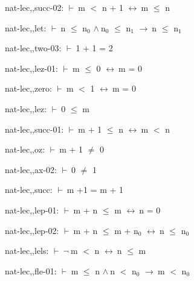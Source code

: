 \documentclass[a4paper]{article}
\newcommand{\Fol}{\mbox{$\vdash\ $}}
\newcommand{\Not}{\mbox{$\neg\ $}}
\newcommand{\And}{\mbox{$\wedge\ $}}
\newcommand{\Imp}{\mbox{$\rightarrow\ $}}
\newcommand{\Equiv}{\mbox{$\leftrightarrow\ $}}
\begin{document}
nat-lec,,succ-02: 
 \Fol m $<$ n + 1 \Equiv m $\le$ n



\bigskip

nat-lec,,let: 
 \Fol n $\le$ $\mbox{n}_{0}$ \And $\mbox{n}_{0}$ $\le$ $\mbox{n}_{1}$ \Imp n $\le$ $\mbox{n}_{1}$



\bigskip

nat-lec,,two-03: 
 \Fol 1 + 1 = 2



\bigskip

nat-lec,,lez-01: 
 \Fol m $\le$ 0 \Equiv m = 0



\bigskip

nat-lec,,zero: 
 \Fol m $<$ 1 \Equiv m = 0



\bigskip

nat-lec,,lez: 
 \Fol 0 $\le$ m



\bigskip

nat-lec,,succ-01: 
 \Fol m + 1 $\le$ n \Equiv m $<$ n



\bigskip

nat-lec,,oz: 
 \Fol m + 1 $\neq$ 0



\bigskip

nat-lec,,ax-02: 
 \Fol 0 $\neq$ 1



\bigskip

nat-lec,,succ: 
 \Fol m +1 = m + 1



\bigskip

nat-lec,,lep-01: 
 \Fol m + n $\le$ m \Equiv n = 0



\bigskip

nat-lec,,lep-02: 
 \Fol m + n $\le$ m + $\mbox{n}_{0}$ \Equiv n $\le$ $\mbox{n}_{0}$



\bigskip

nat-lec,,lels: 
 \Fol \Not m $<$ n \Equiv n $\le$ m



\bigskip

nat-lec,,fle-01: 
 \Fol m $\le$ n \And n $<$ $\mbox{n}_{0}$ \Imp m $<$ $\mbox{n}_{0}$



\bigskip
\end{document}

